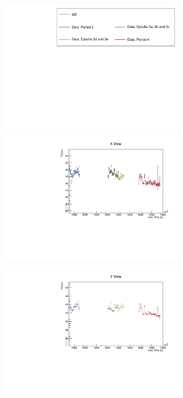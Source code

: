 \documentclass[12pt,a4paper]{article}
\begin{document}
\begin{figure}[!ht]
  \begin{subfigure}{\textwidth}
    \centering
    \includegraphics[height=0.2\linewidth]{essentialsec_tb/legend.pdf}
  \end{subfigure}
  \vspace*{2mm}
  
  \begin{subfigure}{0.5\textwidth}
    \includegraphics[width=\linewidth]{driftsec_tb/pecm_time_x.pdf}
  \end{subfigure}
  \begin{subfigure}{0.5\textwidth}
    \includegraphics[width=\linewidth]{driftsec_tb/pecm_time_y.pdf}

\end{subfigure}
\end{figure}
\end{document}
